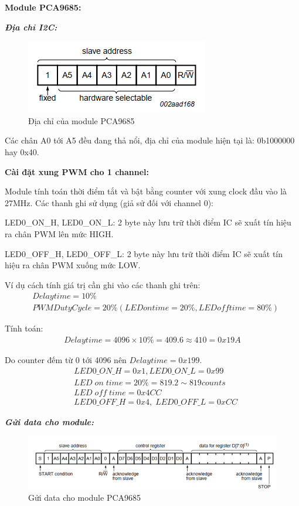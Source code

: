 \textbf{Module PCA9685:}

\textbf{\textit{Địa chỉ I2C:}}
\begin{figure}[H]
	\centering
	\includegraphics[scale=1]{Chapters/Chapter5/Images/AddressPCA.png}
	\caption{Địa chỉ của module PCA9685}
	\label{fig:C5AddressPCA}
\end{figure}

Các chân A0 tới A5 đều đang thả nổi, địa chỉ của module hiện tại là: 0b1000000 hay 0x40. 

\textbf{Cài đặt xung PWM cho 1 channel:}

Module tính toán thời điểm tắt và bật bằng counter với xung clock đầu vào là 27MHz. Các thanh ghi sử dụng (giả sử đối với channel 0):

LED0\_ON\_H, LED0\_ON\_L: 2 byte này lưu trữ thời điểm IC sẽ xuất tín hiệu ra chân PWM lên mức HIGH.

LED0\_OFF\_H, LED0\_OFF\_L: 2 byte này lưu trữ thời điểm IC sẽ xuất tín hiệu ra chân PWM xuống mức LOW.

Ví dụ cách tính giá trị cần ghi vào các thanh ghi trên:
\begin{align*}
&Delay time =  10\% \\
&PWM Duty Cycle = 20\% (LED on time = 20\%, LED off time = 80\%)
\end{align*}

Tính toán: 
\begin{align*}
Delay time = 4096 \times 10\% = 409.6 \approx 410 = 0x19A
\end{align*}

Do counter đếm từ 0 tới 4096 nên $ Delay time = 0x199 $.
\begin{align*}
&LED0\_ON\_H = 0x1, LED0\_ON\_L = 0x99 \\
&LED \; on \; time = 20\% = 819.2 \sim 819 counts \\
&LED \; off \; time = 0x4CC \\
&LED0\_OFF\_H = 0x4,\; LED0\_OFF\_L = 0xCC 
\end{align*}

\textbf{\textit{Gửi data cho module:}}
\begin{figure}[H]
	\centering
	\includegraphics[scale=0.9]{Chapters/Chapter5/Images/SendDataPCA.png}
	\caption{Gửi data cho module PCA9685}
	\label{fig:C5SendDataPCA}
\end{figure}

